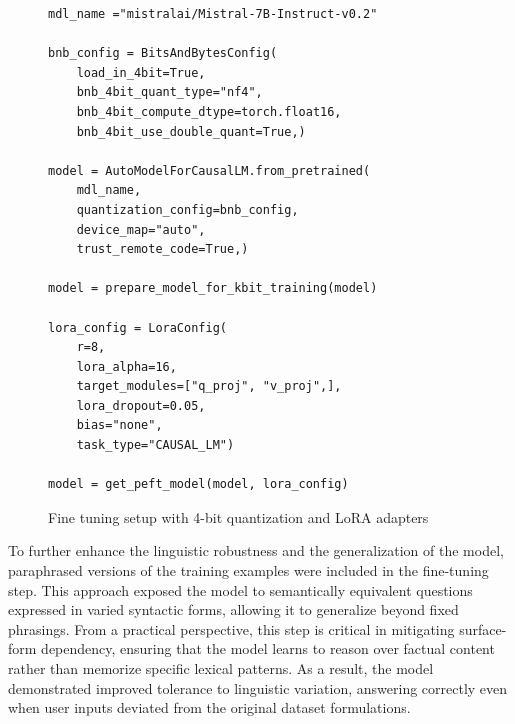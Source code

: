 \begin{figure}[h!]
\centering
\begin{lstlisting}
mdl_name ="mistralai/Mistral-7B-Instruct-v0.2"

bnb_config = BitsAndBytesConfig(
    load_in_4bit=True,
    bnb_4bit_quant_type="nf4",
    bnb_4bit_compute_dtype=torch.float16,
    bnb_4bit_use_double_quant=True,)

model = AutoModelForCausalLM.from_pretrained(
    mdl_name,
    quantization_config=bnb_config,
    device_map="auto",
    trust_remote_code=True,)
    
model = prepare_model_for_kbit_training(model)

lora_config = LoraConfig(
    r=8,                            
    lora_alpha=16,                  
    target_modules=["q_proj", "v_proj",],
    lora_dropout=0.05,           
    bias="none",                 
    task_type="CAUSAL_LM")

model = get_peft_model(model, lora_config)
\end{lstlisting}
\caption{Fine tuning setup with 4-bit quantization and LoRA adapters}
\label{fig:fine_tuning_pseudo}
\end{figure}

To further enhance the linguistic robustness and the generalization of the model, paraphrased versions of the training examples were included in the fine-tuning step. This approach exposed the model to semantically equivalent questions expressed in varied syntactic forms, allowing it to generalize beyond fixed phrasings. From a practical perspective, this step is critical in mitigating surface-form dependency, ensuring that the model learns to reason over factual content rather than memorize specific lexical patterns. As a result, the model demonstrated improved tolerance to linguistic variation, answering correctly even when user inputs deviated from the original dataset formulations.


